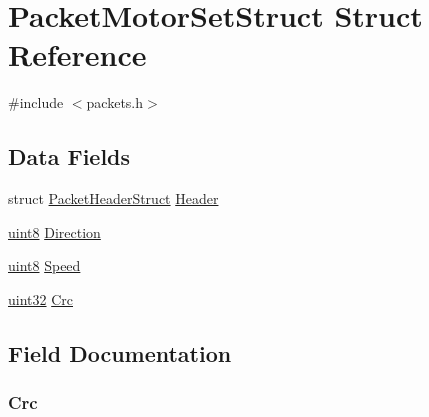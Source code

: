 \hypertarget{struct_packet_motor_set_struct}{}\section{Packet\+Motor\+Set\+Struct Struct Reference}
\label{struct_packet_motor_set_struct}


{\ttfamily \#include $<$packets.\+h$>$}

\subsection*{Data Fields}
\begin{DoxyCompactItemize}
\item 
struct \hyperlink{struct_packet_header_struct}{Packet\+Header\+Struct} \hyperlink{struct_packet_motor_set_struct_ab201af50281aff5ed4f984f994938007}{Header}
\item 
\hyperlink{_h_y_d_r_a_s_8_x_2types_8h_a33a5e996e7a90acefb8b1c0bea47e365}{uint8} \hyperlink{struct_packet_motor_set_struct_a9e5dd9f1ebbbade8fbdc079530942301}{Direction}
\item 
\hyperlink{_h_y_d_r_a_s_8_x_2types_8h_a33a5e996e7a90acefb8b1c0bea47e365}{uint8} \hyperlink{struct_packet_motor_set_struct_a2086864522a7bdf2603f5a19254376f0}{Speed}
\item 
\hyperlink{_h_y_d_r_a_s_8_x_2types_8h_acbd4acd0d29e2d6c43104827f77d9cd2}{uint32} \hyperlink{struct_packet_motor_set_struct_a1aaa4998291cff4c19ca5cca4b1e9489}{Crc}
\end{DoxyCompactItemize}


\subsection{Field Documentation}
\hypertarget{struct_packet_motor_set_struct_a1aaa4998291cff4c19ca5cca4b1e9489}{}
\subsubsection[{Crc}]{ Crc}\label{struct_packet_motor_set_struct_a1aaa4998291cff4c19ca5cca4b1e9489}
\hypertarget{struct_packet_motor_set_struct_a9e5dd9f1ebbbade8fbdc079530942301}{}
